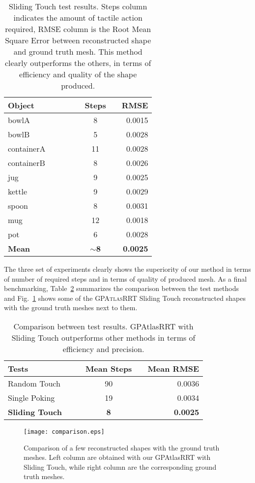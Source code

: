 \begin{table}
    \centering
    \begin{tabularx}{0.95\columnwidth}{lccccccr}
        \toprule
        Object & & &&& Steps && RMSE \\
        \midrule
        bowlA &&& & &8 && 0.0015\\
        bowlB & &&& &5 && 0.0028\\
        containerA &&&&& 11 && 0.0028\\
        containerB &&&&& 8 && 0.0026\\
        jug &&&&& 9 && 0.0025\\
        kettle &&&&& 9 && 0.0029\\
        spoon &&&&& 8 && 0.0031\\
        mug &&&&& 12 && 0.0018\\
        pot &&&&& 6 && 0.0028\\
        \midrule
        \textbf{Mean} &&&&& $\sim$\textbf{8} && \textbf{0.0025}\\
        \bottomrule
    \end{tabularx}
    \caption{Sliding Touch test results. Steps column indicates the amount of tactile action required, RMSE
    column is the Root Mean Square Error between reconstructed shape and ground truth mesh. This method clearly
outperforms the others, in terms of efficiency and quality of the shape produced.}
    \label{tab:test3}
\end{table}

The three set of experiments clearly shows the superiority of our method in terms of number of required steps
and in terms of quality of produced mesh. As a final benchmarking, Table~\ref{tab:comp} summarizes the comparison
between the test methods and Fig.~\ref{fig:shapecomp} shows some  of the \textsc{GPAtlasRRT} Sliding Touch reconstructed shapes with
the ground truth meshes next to them.
\begin{table}
    \centering
    \begin{tabularx}{0.95\columnwidth}{lccccr}
        \toprule
        Tests  &&& Mean Steps && Mean RMSE \\
        \midrule
        Random Touch & & &90 && 0.0036\\
        Single Poking && &19 && 0.0034\\
        \textbf{Sliding Touch} &&& \textbf{8} && \textbf{0.0025}\\
        \bottomrule
    \end{tabularx}
    \caption{Comparison between test results. GPAtlasRRT with Sliding Touch outperforms other methods in terms
    of efficiency and precision.}
    \label{tab:comp}
\end{table}
\begin{figure}[htb]
    \centering
    \texttt{[image: comparison.eps]}
    \caption{Comparison of a few reconstructed shapes with the ground truth meshes. Left column are obtained with our GPAtlasRRT with Sliding Touch, while right column are the corresponding ground truth meshes.}
    \label{fig:shapecomp}
\end{figure}

